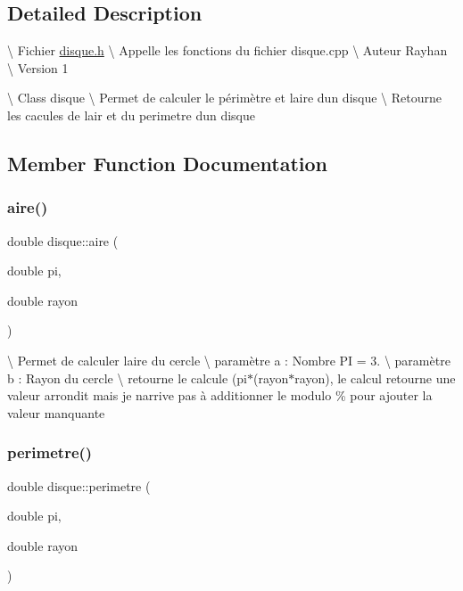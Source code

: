\subsection{Detailed Description}
\textbackslash{} Fichier \hyperlink{disque_8h_source}{disque.\+h} \textbackslash{} Appelle les fonctions du fichier disque.\+cpp \textbackslash{} Auteur Rayhan \textbackslash{} Version 1

\textbackslash{} Class disque \textbackslash{} Permet de calculer le périmètre et laire d\textquotesingle{}un disque \textbackslash{} Retourne les cacules de l\textquotesingle{}air et du perimetre d\textquotesingle{}un disque 

\subsection{Member Function Documentation}
\mbox{\label{classdisque_a2b62779089ca6d996789f5cb63f0b6a1}} 
\subsubsection{\texorpdfstring{aire()}{aire()}}
{\footnotesize\ttfamily double disque\+::aire (\begin{DoxyParamCaption}\item[{double}]{pi,  }\item[{double}]{rayon }\end{DoxyParamCaption})}

\textbackslash{} Permet de calculer l\textquotesingle{}aire du cercle \textbackslash{} paramètre a \+: Nombre PI = 3. \textbackslash{} paramètre b \+: Rayon du cercle \textbackslash{} retourne le calcule (pi$\ast$(rayon$\ast$rayon), le calcul retourne une valeur arrondit mais je n\textquotesingle{}arrive pas à additionner le modulo \% pour ajouter la valeur manquante \mbox{\label{classdisque_a050ca11b1180244c645b4122a8a675a5}} 
\subsubsection{\texorpdfstring{perimetre()}{perimetre()}}
{\footnotesize\ttfamily double disque\+::perimetre (\begin{DoxyParamCaption}\item[{double}]{pi,  }\item[{double}]{rayon }\end{DoxyParamCaption})}

